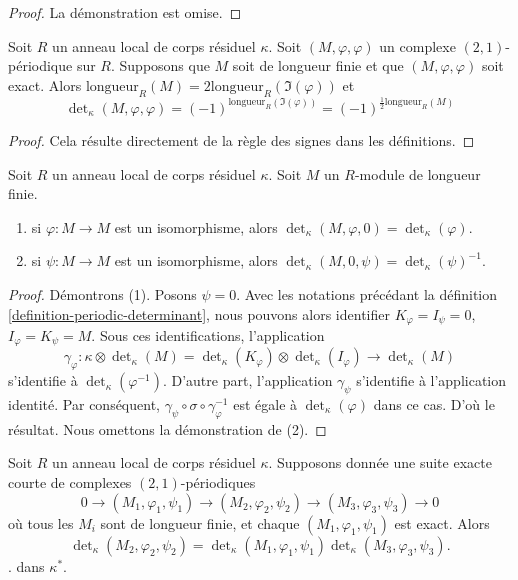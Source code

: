 \begin{proof}
La démonstration est omise.
\end{proof}

\begin{lemma}
\label{lemma-periodic-determinant-sign}
Soit $R$ un anneau local de corps résiduel $\kappa$.
Soit $(M, \varphi, \varphi)$ un complexe $(2, 1)$-périodique sur $R$.
Supposons que $M$ soit de longueur finie et que $(M, \varphi, \varphi)$ soit
exact. Alors $\text{longueur}_R(M) = 2 \text{longueur}_R(\Im(\varphi))$
et
$$
\det\nolimits_\kappa(M, \varphi, \varphi)
=
(-1)^{\text{longueur}_R(\Im(\varphi))}
=
(-1)^{\frac{1}{2}\text{longueur}_R(M)}
$$
\end{lemma}

\begin{proof}
Cela résulte directement de la règle des signes dans les définitions.
\end{proof}

\begin{lemma}
\label{lemma-periodic-determinant-easy-case}
Soit $R$ un anneau local de corps résiduel $\kappa$.
Soit $M$ un $R$-module de longueur finie.
\begin{enumerate}
\item si $\varphi : M \to M$ est un isomorphisme, alors
$\det_\kappa(M, \varphi, 0) = \det_\kappa(\varphi)$.
\item si $\psi : M \to M$ est un isomorphisme, alors
$\det_\kappa(M, 0, \psi) = \det_\kappa(\psi)^{-1}$.
\end{enumerate}
\end{lemma}

\begin{proof}
Démontrons (1). Posons $\psi = 0$. Avec les notations
précédant la définition \ref{definition-periodic-determinant}, nous pouvons alors identifier
$K_\varphi = I_\psi = 0$, $I_\varphi = K_\psi = M$.
Sous ces identifications, l'application
$$
\gamma_\varphi :
\kappa \otimes \det\nolimits_\kappa(M)
=
\det\nolimits_\kappa(K_\varphi)
\otimes
\det\nolimits_\kappa(I_\varphi)
\longrightarrow
\det\nolimits_\kappa(M)
$$
s'identifie à $\det_\kappa(\varphi^{-1})$. D'autre part,
l'application $\gamma_\psi$ s'identifie à l'application identité. Par conséquent,
$\gamma_\psi \circ \sigma \circ \gamma_\varphi^{-1}$ est égale
à $\det_\kappa(\varphi)$ dans ce cas. D'où le résultat.
Nous omettons la démonstration de (2).
\end{proof}

\begin{lemma}
\label{lemma-periodic-determinant}
Soit $R$ un anneau local de corps résiduel $\kappa$.
Supposons donnée une suite exacte courte de
complexes $(2, 1)$-périodiques
$$
0 \to (M_1, \varphi_1, \psi_1)
\to (M_2, \varphi_2, \psi_2)
\to (M_3, \varphi_3, \psi_3)
\to 0
$$
où tous les $M_i$ sont de longueur finie, et chaque $(M_1, \varphi_1, \psi_1)$ est exact.
Alors
$$
\det\nolimits_\kappa(M_2, \varphi_2, \psi_2) =
\det\nolimits_\kappa(M_1, \varphi_1, \psi_1)
\det\nolimits_\kappa(M_3, \varphi_3, \psi_3).
$$
. dans $\kappa^*$.
\end{lemma}

